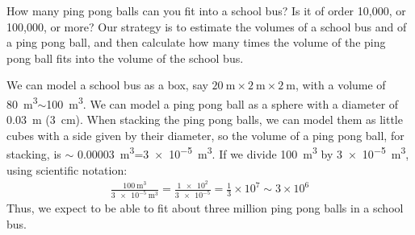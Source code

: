 \begin{example}{How many ping pong balls can you fit into a school bus? Is it of order 10,000, or 100,000, or more?}
Our strategy is to estimate the volumes of a school bus and of a ping pong ball, and then calculate how many times the volume of the ping pong ball fits into the volume of the school bus.

We can model a school bus as a box, say $\SI{20}{\meter}\times \SI{2}{\meter}\times\SI{2}{\meter}$, with a volume of \SI{80}{\meter\cubed}$\sim$\SI{100}{\meter\cubed}. We can model a ping pong ball as a sphere with a diameter of \SI{0.03}{\meter} (\SI{3}{\centi\meter}). When stacking the ping pong balls, we can model them as little cubes with a side given by their diameter, so the volume of a ping pong ball, for stacking, is $\sim$ \SI{0.00003}{\meter\cubed}=\SI{3e-5}{\meter\cubed}. If we divide \SI{100}{\meter\cubed} by \SI{3e-5}{\meter\cubed}, using scientific notation:
\begin{align*}
\frac{\SI{100}{\meter\cubed}}{\SI{3e-5}{\meter\cubed}}=\frac{\num{1e2}}{\num{3e-5}}=\frac{1}{3}\times 10^7\sim 3\times 10^6
\end{align*}
Thus, we expect to be able to fit about three million ping pong balls in a school bus. 


\end{example}

